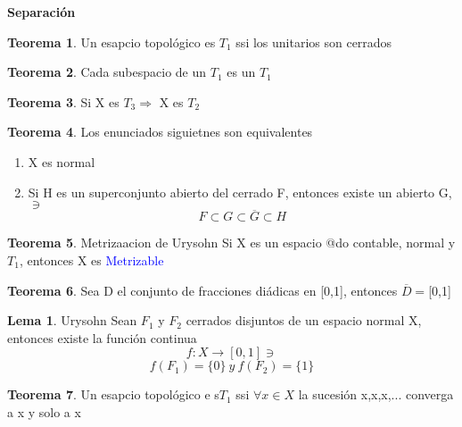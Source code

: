 \documentclass{article}
\theoremstyle{definition}
\newtheorem{theorem}{Teorema}[section]
\newtheorem{lemma}{Lema}[section]
\begin{document}
\textbf{Separación}
\begin{theorem}
	Un esapcio topológico es $T_1$ ssi los unitarios son cerrados
\end{theorem}


\begin{theorem}
	Cada subespacio de un $T_1$ es un $T_1$
\end{theorem}


\begin{theorem}
	Si X es $T_3\Rightarrow$ X es $T_2$
\end{theorem}


\begin{theorem}

	Los enunciados siguietnes son equivalentes
	\begin{enumerate}
		\item X es normal
		\item Si H es un superconjunto abierto del cerrado F, entonces existe un abierto G, $\ni$
		\[F\subset G\subset \overline{G}\subset H\]
	\end{enumerate}
\end{theorem}


\begin{theorem}{Metrizaacion de Urysohn}
	Si X es un espacio @do contable, normal y $T_1$, entonces X es \textcolor{blue}{Metrizable}
\end{theorem}


\begin{theorem}
	Sea D el conjunto de fracciones diádicas en [0,1], entonces $\overline{D}=$[0,1]
\end{theorem}


\begin{lemma}{Urysohn}
	Sean $F_1$ y $F_2$ cerrados disjuntos de un espacio normal X, entonces existe la función continua 
	\[f:X\to[0,1]\ni\]
	\[f(F_1)=\{0\}\ y \ f(F_2)=\{1\}\]
\end{lemma}


\begin{theorem}
	Un esapcio topológico e s$T_1$ ssi $\forall x\in X$ la sucesión x,x,x,... converga a x y solo a x
\end{theorem}
\end{document}
